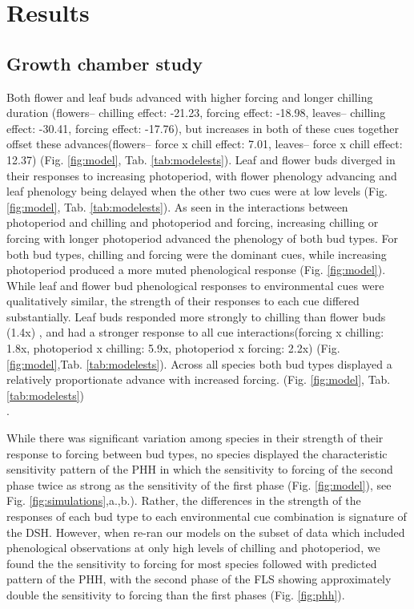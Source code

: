\documentclass[11pt]{article}\usepackage[]{graphicx}\usepackage[]{color}
\begin{document}
\section*{Results} 
\subsection*{Growth chamber study} 
\noindent  Both flower and leaf buds advanced with higher forcing and longer chilling duration (flowers-- chilling effect: -21.23, forcing effect: -18.98, leaves-- chilling effect: -30.41, forcing effect: -17.76), but increases in both of these cues together offset these advances(flowers-- force x chill effect: 7.01, leaves-- force x chill effect: 12.37) (Fig. \ref{fig:model}, Tab. \ref{tab:modelests}). Leaf and flower buds diverged in their responses to increasing photoperiod, with flower phenology advancing and leaf phenology being delayed when the other two cues were at low levels (Fig. \ref{fig:model}, Tab. \ref{tab:modelests}). As seen in the interactions between photoperiod and chilling and photoperiod and forcing, increasing chilling or forcing with longer photoperiod advanced the phenology of both bud types. For both bud types, chilling and forcing were the dominant cues, while increasing photoperiod produced a more muted phenological response (Fig. \ref{fig:model}). \\

\noindent While leaf and flower bud phenological responses to environmental cues were qualitatively similar, the strength of their responses to each cue differed substantially. Leaf buds responded more strongly to chilling than flower buds (1.4x) , and had a stronger response to all cue interactions(forcing x chilling: 1.8x, photoperiod x chilling: 5.9x, photoperiod x forcing: 2.2x) (Fig. \ref{fig:model},Tab. \ref{tab:modelests}). Across all species both bud types displayed a relatively proportionate advance with increased forcing. (Fig. \ref{fig:model}, Tab. \ref{tab:modelests})\\.

\noindent While there was significant variation among species in their strength of their response to forcing between bud types, no species displayed the characteristic sensitivity pattern of the PHH in which the sensitivity to forcing of the second phase twice as strong as the sensitivity of the first phase (Fig. \ref{fig:model}), see Fig. \ref{fig:simulations},a.,b.). Rather, the differences in the strength of the responses of each bud type to each environmental cue combination is signature of the DSH. However, when re-ran our models on the subset of data which included phenological observations at only high levels of chilling and photoperiod, we found the the sensitivity to forcing for most species followed with predicted pattern of the PHH, with the second phase of the FLS showing approximately double the sensitivity to forcing than the first phases (Fig. \ref{fig:phh}).\\
\end{document}

